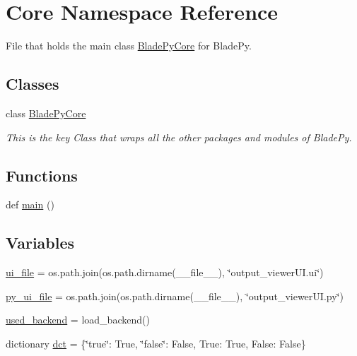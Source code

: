 \hypertarget{a00050}{}\section{Core Namespace Reference}
\label{a00050}


File that holds the main class \hyperlink{a00078}{Blade\+Py\+Core} for Blade\+Py.  


\subsection*{Classes}
\begin{DoxyCompactItemize}
\item 
class \hyperlink{a00078}{Blade\+Py\+Core}
\begin{DoxyCompactList}\small\item\em This is the key Class that wraps all the other packages and modules of Blade\+Py. \end{DoxyCompactList}\end{DoxyCompactItemize}
\subsection*{Functions}
\begin{DoxyCompactItemize}
\item 
def \hyperlink{a00050_abbe2fb717a0d4efddde9090f186bd64b}{main} ()
\end{DoxyCompactItemize}
\subsection*{Variables}
\begin{DoxyCompactItemize}
\item 
\hyperlink{a00050_a1363a763ded79810023c205b7ed824f0}{ui\+\_\+file} = os.\+path.\+join(os.\+path.\+dirname(\+\_\+\+\_\+file\+\_\+\+\_\+), \char`\"{}output\+\_\+viewer\+U\+I.\+ui\char`\"{})
\item 
\hyperlink{a00050_a4cd2f45c63964d86002d7a37c7141973}{py\+\_\+ui\+\_\+file} = os.\+path.\+join(os.\+path.\+dirname(\+\_\+\+\_\+file\+\_\+\+\_\+), \char`\"{}output\+\_\+viewer\+U\+I.\+py\char`\"{})
\item 
\hyperlink{a00050_a5233d27f0fe842cb39f926c4360e63dd}{used\+\_\+backend} = load\+\_\+backend()
\item 
dictionary \hyperlink{a00050_a929c2310eb32ddd6da7fa2835f7f96d1}{dct} = \{\char`\"{}true\char`\"{}\+: True, \char`\"{}false\char`\"{}\+: False, True\+: True, False\+: False\}
\end{DoxyCompactItemize}


